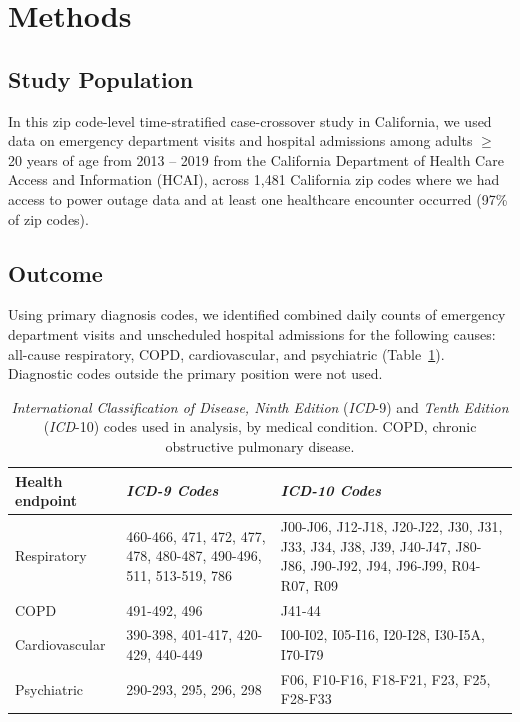 \documentclass[../main.tex]{subfiles}
\begin{document}
\section{Methods}
\label{sec:methods}

\subsection{Study Population}
In this zip code-level time-stratified case-crossover\citep{lumley_bias_2000} study in California, we used data on emergency department visits and hospital admissions among adults $\geq$ 20 years of age from 2013 -- 2019 from the California Department of Health Care Access and Information (HCAI), \citep{noauthor_hcai_nodate} across 1,481 California zip codes where we had access to power outage data and at least one healthcare encounter occurred (97\% of zip codes). 

\subsection{Outcome}
Using primary diagnosis codes, we identified combined daily counts of emergency department visits and unscheduled hospital admissions for the following causes: all-cause respiratory, COPD, cardiovascular, and psychiatric (Table~\ref{tab:icd_codes}). Diagnostic codes outside the primary position were not used. 



\begin{table}[htbp]
\centering
\begin{tabular}{|p{}|p{}|p{}|}
\hline
\textbf{Health endpoint} & \textbf{\textit{ICD-9 Codes}} & \textbf{\textit{ICD-10 Codes}} \\
\hline
Respiratory & 460-466, 471, 472, 477, 478, 480-487, 490-496, 511, 513-519, 786 & J00-J06, J12-J18, J20-J22, J30, J31, J33, J34, J38, J39, J40-J47, J80-J86, J90-J92, J94, J96-J99, R04-R07, R09 \\
\hline
COPD & 491-492, 496 & J41-44 \\
\hline
Cardiovascular & 390-398, 401-417, 420-429, 440-449 & I00-I02, I05-I16, I20-I28, I30-I5A, I70-I79 \\
\hline
Psychiatric & 290-293, 295, 296, 298 & F06, F10-F16, F18-F21, F23, F25, F28-F33 \\
\hline
\end{tabular}
\caption{\textit{International Classification of Disease, Ninth Edition} (\textit{ICD}-9) and \textit{Tenth Edition} (\textit{ICD}-10) codes used in analysis, by medical condition. COPD, chronic obstructive pulmonary disease.} 
\label{tab:icd_codes}
\end{table}
\end{document}
